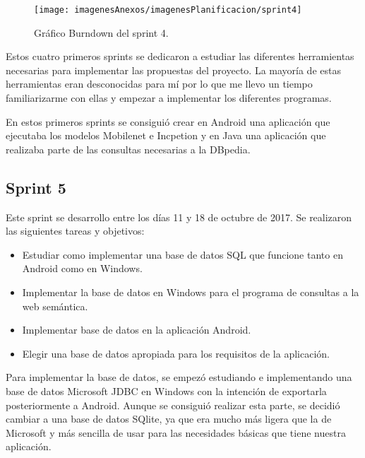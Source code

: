 \begin{figure}[h]
    \begin{center}%
        \begin{center}%
          \texttt{[image: imagenesAnexos/imagenesPlanificacion/sprint4]}%
          \caption{Gráfico Burndown del sprint 4.}%
          \label{figSprint4}%
        \end{center}%
  	\end{center}%
\end{figure}%

Estos cuatro primeros sprints se dedicaron a estudiar las diferentes herramientas necesarias para implementar las propuestas del proyecto. La mayoría de estas herramientas eran desconocidas para mí por lo que me llevo un tiempo familiarizarme con ellas y empezar a implementar los diferentes programas.

En estos primeros sprints se consiguió crear en Android una aplicación que ejecutaba los modelos Mobilenet e Incpetion y en Java una aplicación que realizaba parte de las consultas necesarias a la DBpedia.

\subsection{Sprint 5}

Este sprint se desarrollo entre los días 11 y 18 de octubre de 2017. Se realizaron las siguientes tareas y objetivos:

\begin{itemize}
	\item Estudiar como implementar una base de datos SQL que funcione tanto en Android como en Windows.
	\item Implementar la base de datos en Windows para el programa de consultas a la web semántica.
	\item Implementar base de datos en la aplicación Android.
	\item Elegir una base de datos apropiada para los requisitos de la aplicación.
\end{itemize}

Para implementar la base de datos, se empezó estudiando e implementando una base de datos Microsoft JDBC en Windows con la intención de exportarla posteriormente a Android. Aunque se consiguió realizar esta parte, se decidió cambiar a una base de datos SQlite, ya que era mucho más ligera que la de Microsoft y más sencilla de usar para las necesidades básicas que tiene nuestra aplicación.

